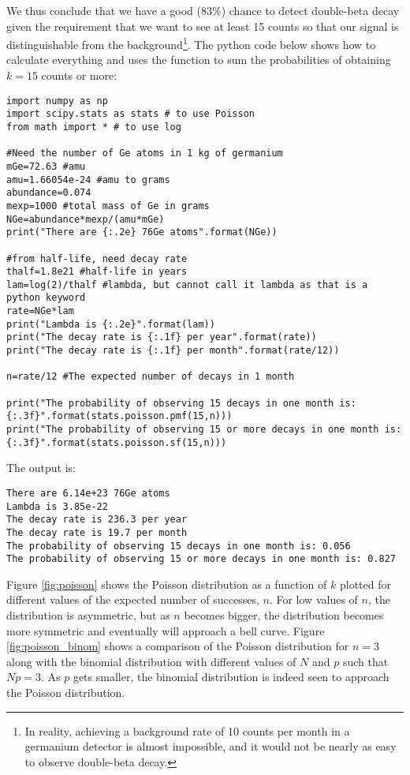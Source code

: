 \begin{example}{}
We thus conclude that we have a good (83\%) chance to detect double-beta decay given the requirement that we want to see at least 15 counts so that our signal is distinguishable from the background\footnote{In reality, achieving a background rate of 10 counts per month in a germanium detector is almost impossible, and it would not be nearly as easy to observe double-beta decay.}. The python code below shows how to calculate everything and uses the function  to sum the probabilities of obtaining $k=15$ counts or more:
\begin{lstlisting}[frame=single] 
import numpy as np
import scipy.stats as stats # to use Poisson
from math import * # to use log

#Need the number of Ge atoms in 1 kg of germanium
mGe=72.63 #amu
amu=1.66054e-24 #amu to grams
abundance=0.074
mexp=1000 #total mass of Ge in grams
NGe=abundance*mexp/(amu*mGe)
print("There are {:.2e} 76Ge atoms".format(NGe))

#from half-life, need decay rate
thalf=1.8e21 #half-life in years
lam=log(2)/thalf #lambda, but cannot call it lambda as that is a python keyword
rate=NGe*lam
print("Lambda is {:.2e}".format(lam))
print("The decay rate is {:.1f} per year".format(rate))
print("The decay rate is {:.1f} per month".format(rate/12))

n=rate/12 #The expected number of decays in 1 month

print("The probability of observing 15 decays in one month is: {:.3f}".format(stats.poisson.pmf(15,n)))
print("The probability of observing 15 or more decays in one month is: {:.3f}".format(stats.poisson.sf(15,n)))
\end{lstlisting}
The output is:
\begin{verbatim}
There are 6.14e+23 76Ge atoms
Lambda is 3.85e-22
The decay rate is 236.3 per year
The decay rate is 19.7 per month
The probability of observing 15 decays in one month is: 0.056
The probability of observing 15 or more decays in one month is: 0.827
\end{verbatim}

\end{example}

Figure \ref{fig:poisson} shows the Poisson distribution as a function of $k$ plotted for different values of the expected number of successes, $n$. For low values of $n$, the distribution is asymmetric, but as $n$ becomes bigger, the distribution becomes more symmetric and eventually will approach a bell curve. Figure \ref{fig:poisson_binom} shows a comparison of the Poisson distribution for $n=3$ along with the binomial distribution with different values of $N$ and $p$ such that $Np=3$. As $p$ gets smaller, the binomial distribution is indeed seen to approach the Poisson distribution.

